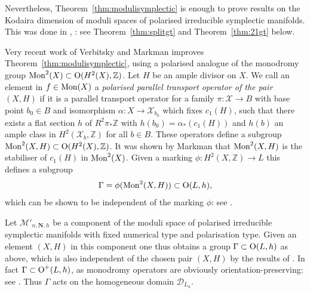\documentclass[a4paper,11pt]{article}
\newcommand{\ZZ}{\mathbb Z}
\renewcommand{\cD}{\mathcal D}
\newcommand{\cM}{\mathcal M}
\newcommand{\cX}{\mathcal X}
\newcommand{\Orth}{\mathop{\null\mathrm {O}}\nolimits}
\newcommand{\Mon}{\mathop{\null\mathrm {Mon}}\nolimits}
\newcommand{\bdN}{\mathbf N}
\begin{document}
Nevertheless, Theorem~\ref{thm:modulisymplectic} is enough to prove
results on the Kodaira dimension of moduli spaces of polarised
irreducible symplectic manifolds. This was done in \cite{GHSsymp},
\cite{GHSdim21}: see Theorem~\ref{thm:splitgt} and Theorem~\ref{thm:21gt}
below.

Very recent work of Verbitsky \cite{Ver} and Markman \cite{Mar4}
improves Theorem~\ref{thm:modulisymplectic}, using a polarised
analogue of the monodromy group $\Mon^2(X) \subset \Orth(H^2(X),\ZZ)$.
Let $H$ be an ample divisor on $X$.  We call an element in $f \in
\Mon(X)$ a \emph{polarised parallel transport operator of the pair
  $(X,H)$} if it is a parallel transport operator for a family
$\pi\colon \cX \to B$ with base point $b_0 \in B$ and isomorphism
$\alpha\colon X \to \cX_{b_0}$ which fixes $c_1(H)$, such that there
exists a flat section $h$ of $R^2\pi_* \ZZ$ with
$h(b_0)=\alpha_*(c_1(H))$ and $h(b)$ an ample class in
$H^2(\cX_b,\ZZ)$ for all $b \in B$. These operators define a subgroup
$\Mon^2(X,H) \subset \Orth(H^2(X),\ZZ)$. It was shown by Markman
\cite[Proposition~1.9]{Mar4} that $\Mon^2(X,H)$ is the stabiliser of
$c_1(H)$ in $\Mon^2(X)$. Given a marking $\phi\colon H^2(X,\ZZ) \to L$
this defines a subgroup
\begin{equation}\label{monodromyimage}
\Gamma =\phi(\Mon^2(X,H))\subset \Orth(L,h),
\end{equation}
which can be shown to be independent of the marking $\phi$: see
\cite[Section~7.1]{Mar4}.

Let $\cM'_{n,\bdN,h}$ be a component of the moduli space of polarised
irreducible symplectic manifolds with fixed numerical type and
polarisation type. Given an element $(X,H)$ in this component one thus
obtains a group $\Gamma \subset \Orth(L,h)$ as above, which is
also independent of the chosen pair $(X,H)$ by the results of
\cite[Section~7.1]{Mar4}. In fact $\Gamma \subset \Orth^+(L,h)$, as
monodromy operators are obviously orientation-preserving: see \cite[Section~1.2]{Mar4}.
Thus $\Gamma$ acts on the homogeneous domain $\cD_{L_h}$.
\end{document}
